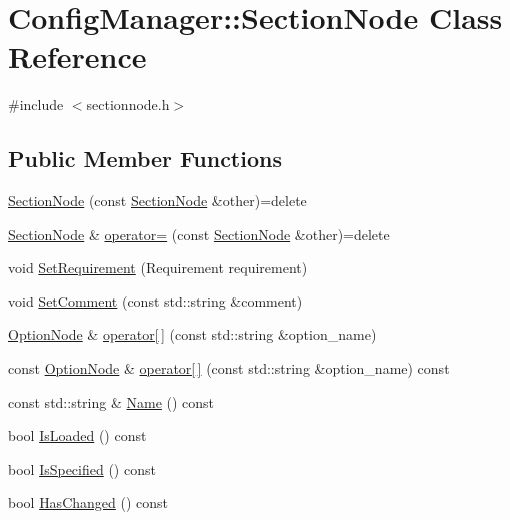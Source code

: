 \hypertarget{class_config_manager_1_1_section_node}{}\section{Config\+Manager\+:\+:Section\+Node Class Reference}
\label{class_config_manager_1_1_section_node}


{\ttfamily \#include $<$sectionnode.\+h$>$}

\subsection*{Public Member Functions}
\begin{DoxyCompactItemize}
\item 
\hyperlink{class_config_manager_1_1_section_node_a29c0bba247577ba6d163c07d54dcbe17}{Section\+Node} (const \hyperlink{class_config_manager_1_1_section_node}{Section\+Node} \&other)=delete
\item 
\hyperlink{class_config_manager_1_1_section_node}{Section\+Node} \& \hyperlink{class_config_manager_1_1_section_node_ab4b00644db1b2b7fda5f7c3a331280be}{operator=} (const \hyperlink{class_config_manager_1_1_section_node}{Section\+Node} \&other)=delete
\item 
void \hyperlink{class_config_manager_1_1_section_node_a74583919e2221acd6f72bf7deac8f49b}{Set\+Requirement} (Requirement requirement)
\item 
void \hyperlink{class_config_manager_1_1_section_node_ad71ca3c764c64f37522c47a464a3454f}{Set\+Comment} (const std\+::string \&comment)
\item 
\hyperlink{class_config_manager_1_1_option_node}{Option\+Node} \& \hyperlink{class_config_manager_1_1_section_node_a8516cbcb01048e0509f4cee76555aa43}{operator\mbox{[}$\,$\mbox{]}} (const std\+::string \&option\+\_\+name)
\item 
const \hyperlink{class_config_manager_1_1_option_node}{Option\+Node} \& \hyperlink{class_config_manager_1_1_section_node_a4ccb40813d717b21708254ace493cc26}{operator\mbox{[}$\,$\mbox{]}} (const std\+::string \&option\+\_\+name) const 
\item 
const std\+::string \& \hyperlink{class_config_manager_1_1_section_node_ad8bec497af34b75f26128136a0342699}{Name} () const 
\item 
bool \hyperlink{class_config_manager_1_1_section_node_ac557fc56f6d2cca4919949795c34abde}{Is\+Loaded} () const 
\item 
bool \hyperlink{class_config_manager_1_1_section_node_a8194b3e59b3ffe96e2db880f18d078f5}{Is\+Specified} () const 
\item 
bool \hyperlink{class_config_manager_1_1_section_node_a0229147e9270e787320ef40e5eace7bd}{Has\+Changed} () const 
\end{DoxyCompactItemize}


